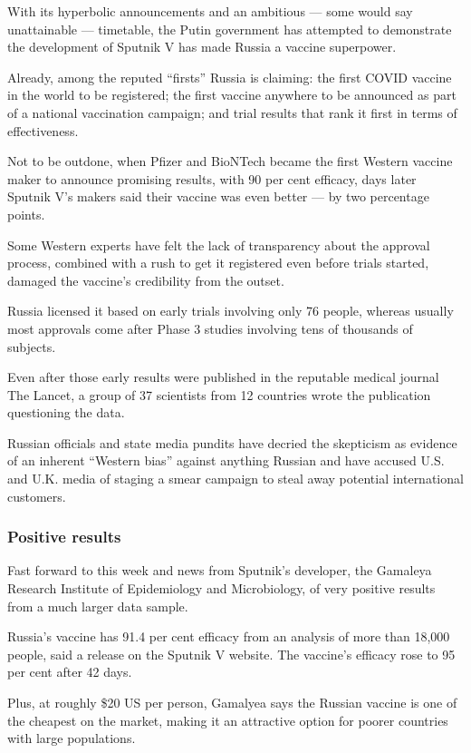 With its hyperbolic announcements and an ambitious — some would say
unattainable — timetable, the Putin government has attempted to demonstrate the
development of Sputnik V has made Russia a vaccine superpower.

Already, among the reputed \enquote{firsts} Russia is claiming: the first COVID vaccine
in the world to be registered; the first vaccine anywhere to be announced as
part of a national vaccination campaign; and trial results that rank it first
in terms of effectiveness.

Not to be outdone, when Pfizer and BioNTech became the first Western vaccine
maker to announce promising results, with 90 per cent efficacy, days later
Sputnik V's makers said their vaccine was even better — by two percentage
points.    

Some Western experts have felt the lack of transparency about the approval
process, combined with a rush to get it registered even before trials started,
damaged the vaccine's credibility from the outset.

Russia licensed it based on early trials involving only 76 people, whereas
usually most approvals come after Phase 3 studies involving tens of thousands
of subjects.     

Even after those early results were published in the reputable medical journal
The Lancet, a group of 37 scientists from 12 countries wrote the publication
questioning the data.

Russian officials and state media pundits have decried the skepticism as
evidence of an inherent \enquote{Western bias} against anything Russian and have
accused U.S. and U.K. media of staging a smear campaign to steal away potential
international customers. 

\subsubsection{Positive results}

Fast forward to this week and news from Sputnik's developer, the Gamaleya
Research Institute of Epidemiology and Microbiology, of very positive results
from a much larger data sample.   

Russia's vaccine has 91.4 per cent efficacy from an analysis of more than
18,000 people, said a release on the Sputnik V website. The vaccine's efficacy
rose to 95 per cent after 42 days.     

Plus, at roughly \$20 US per person, Gamalyea says the Russian vaccine is one of
the cheapest on the market, making it an attractive option for poorer countries
with large populations.

